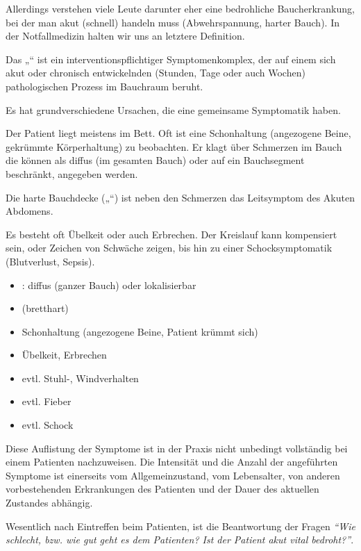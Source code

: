 Allerdings ver\-stehen viele Leute darunter eher
eine bedrohliche Bauch\-erkrankung, bei der man akut (schnell) handeln muss (Ab\-wehrspannung, harter Bauch). In der
Notfallmedizin halten wir uns an letztere Definition. 


{Das „“ ist ein interventionspflichtiger
Symptomenkomplex, der auf einem sich akut oder chronisch
entwickelnden (Stunden, Tage oder auch Wochen) pathologischen
Prozess im Bauchraum beruht.}
{

}{}{}{}

Es hat grundverschiedene Ursachen, die eine gemeinsame
Symptomatik haben.

{%
Der Patient liegt meistens im Bett. Oft ist
eine Schonhaltung (angezogene Beine, gekrümmte
Körperhaltung) zu beobachten. Er klagt über Schmerzen im
Bauch die können als diffus (im gesamten Bauch) oder auf ein Bauchsegment
beschränkt, angegeben werden. 

Die harte Bauchdecke („“) ist neben den
Schmerzen das Leitsymptom des Akuten Abdomens. 

Es besteht oft Übelkeit oder auch Erbrechen. Der Kreislauf
kann kompensiert sein, oder Zeichen von Schwäche zeigen,
bis hin zu einer Schocksymptomatik (Blutverlust, Sepsis).
} 
{
\begin{itemize}
  \item {}: diffus (ganzer Bauch) oder
  lokalisierbar
  \item {} (bretthart)
  \item Schonhaltung  (angezogene Beine, Patient
  krümmt sich)
  \item Übelkeit, Erbrechen
  \item evtl. Stuhl-, Windverhalten
  \item evtl. Fieber
  \item evtl. Schock
\end{itemize}
}{}{}{}


Diese Auflistung der Symptome ist in der Praxis nicht
unbedingt vollständig bei einem Patienten nachzuweisen. Die
Intensität und die Anzahl der angeführten Symptome ist
einerseits vom Allgemeinzustand, vom Lebensalter, von
anderen vorbestehenden Erkrankungen des Patienten und der
Dauer des aktuellen Zustandes abhängig.

Wesentlich nach Eintreffen beim Patienten, ist die
Beantwortung der Fragen \emph{"`Wie schlecht, bzw. wie gut
geht es dem Patienten? Ist der Patient akut vital
bedroht?"'}.


